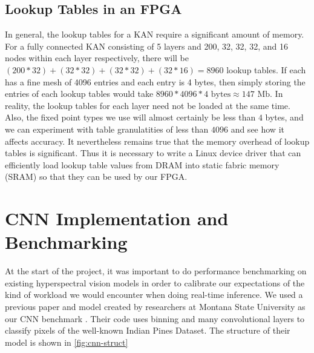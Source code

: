 \documentclass[psamsfonts]{amsart}
\theoremstyle{definition}
\theoremstyle{remark}
\numberwithin{equation}{section}
\begin{document}
\subsection{Lookup Tables in an FPGA}
In general, the lookup tables for a KAN require a significant amount of memory. For a fully connected KAN consisting of 5 layers and 200, 32, 32, 32, and 16 nodes within each layer respectively, there will be $(200 * 32) + (32 * 32) + (32 * 32) + (32 * 16) = 8960$ lookup tables. If each has a fine mesh of 4096 entries and each entry is 4 bytes, then simply storing the entries of each lookup tables would take $8960 * 4096 * 4 \text{ bytes} \approx 147 \text{ Mb}$. In reality, the lookup tables for each layer need not be loaded at the same time. Also, the fixed point types we use will almost certainly be less than $4$ bytes, and we can experiment with table granulatities of less than $4096$ and see how it affects accuracy. It nevertheless remains true that the memory overhead of lookup tables is significant. Thus it is necessary to write a Linux device driver that can efficiently load lookup table values from DRAM into static fabric memory (SRAM) so that they can be used by our FPGA.



\section{CNN Implementation and Benchmarking}
At the start of the project, it was important to do performance benchmarking on existing hyperspectral vision models in order to calibrate our expectations of the kind of workload we would encounter when doing real-time inference. We used a previous paper and model created by researchers at Montana State University as our CNN benchmark \cite{Morales_2021} \cite{rs13183649}. Their code uses binning and many convolutional layers to classify pixels of the well-known Indian Pines Dataset. The structure of their model is shown in \autoref{fig:cnn-struct}
\end{document}
